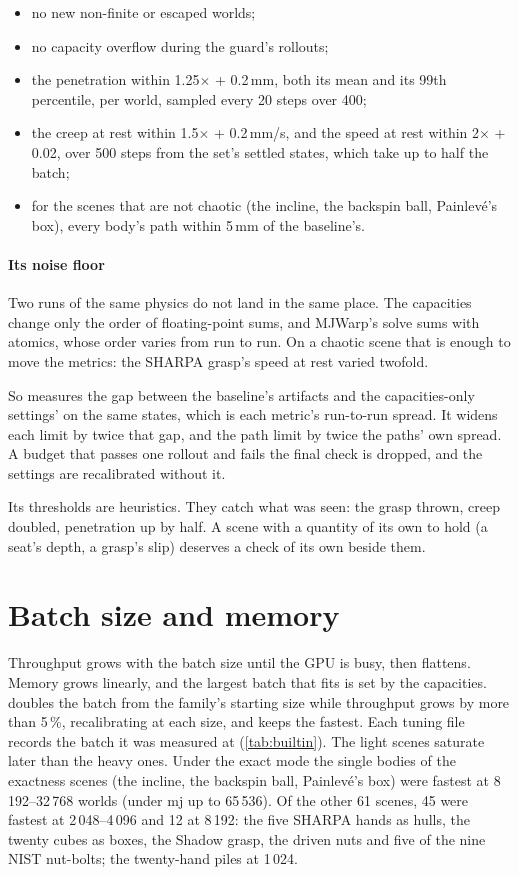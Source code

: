 \begin{itemize}
\item no new non-finite or escaped worlds;
\item no capacity overflow during the guard's rollouts;
\item the penetration within 1.25$\times$ + 0.2\,mm, both its mean and its 99th percentile, per world, sampled every 20 steps over 400;
\item the creep at rest within 1.5$\times$ + 0.2\,mm/s, and the speed at rest within 2$\times$ + 0.02, over 500 steps from the set's settled states, which take up to half the batch;
\item for the scenes that are not chaotic (the incline, the backspin ball, Painlev\'e's box), every body's path within 5\,mm of the baseline's.
\end{itemize}

\paragraph{Its noise floor} Two runs of the same physics do not land in the same place. The capacities change only the order of floating-point sums, and MJWarp's solve sums with atomics, whose order varies from run to run. On a chaotic scene that is enough to move the metrics: the SHARPA grasp's speed at rest varied twofold.

So  measures the gap between the baseline's artifacts and the capacities-only settings' on the same states, which is each metric's run-to-run spread. It widens each limit by twice that gap, and the path limit by twice the paths' own spread. A budget that passes one rollout and fails the final check is dropped, and the settings are recalibrated without it.

Its thresholds are heuristics. They catch what was seen: the grasp thrown, creep doubled, penetration up by half. A scene with a quantity of its own to hold (a seat's depth, a grasp's slip) deserves a check of its own beside them.

\section{Batch size and memory}\label{sec:batch}

Throughput grows with the batch size until the GPU is busy, then flattens. Memory grows linearly, and the largest batch that fits is set by the capacities.  doubles the batch from the family's starting size while throughput grows by more than 5\,\%, recalibrating at each size, and keeps the fastest. Each tuning file records the batch it was measured at (\cref{tab:builtin}). The light scenes saturate later than the heavy ones. Under the exact mode the single bodies of the exactness scenes (the incline, the backspin ball, Painlev\'e's box) were fastest at 8\,192--32\,768 worlds (under mj up to 65\,536). Of the other 61 scenes, 45 were fastest at 2\,048--4\,096 and 12 at 8\,192: the five SHARPA hands as hulls, the twenty cubes as boxes, the Shadow grasp, the driven nuts and five of the nine NIST nut-bolts; the twenty-hand piles at 1\,024.

